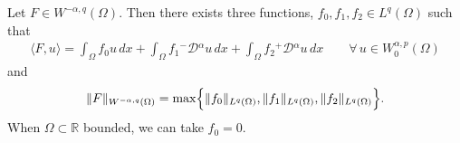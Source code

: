 \documentclass[leqno,final]{siamltex}
\numberwithin{equation}{section}
\renewcommand{\(}{\bigl(}
\renewcommand{\)}{\bigr)}
\newcommand{\R}{\mathbb{R}}
\begin{document}
   \begin{theorem}
   Let $F \in W^{-\alpha ,q}(\Omega)$. Then there exists three functions, $f_0, f_1, f_2 \in L^{q}(\Omega)$ such that 
   \begin{align}\label{SymmetricDualCharacterization}
       \langle F , u \rangle  = \int_{\Omega} f_0 u\, dx + \int_{\Omega} f_1 {^{-}}{\mathcal{D}}{^{\alpha}} u \,dx + \int_{\Omega} f_2 {^{+}}{\mathcal{D}}{^{\alpha}} u\, dx \qquad \forall \, u \in W^{\alpha , p }_{0}(\Omega)
   \end{align}
   and 
   \begin{align}\label{DualNorm}
       \|F\|_{W^{-\alpha, q}(\Omega)} = \max \Bigl\{ \|f_0\|_{L^{q}(\Omega)},\|f_1\|_{L^{q}(\Omega)}, \|f_2\|_{L^{q}(\Omega)} \Bigr\}.
   \end{align}
   When $\Omega \subset \R$ bounded, we can take $f_0 = 0$.
   \end{theorem}
   
\end{document}
